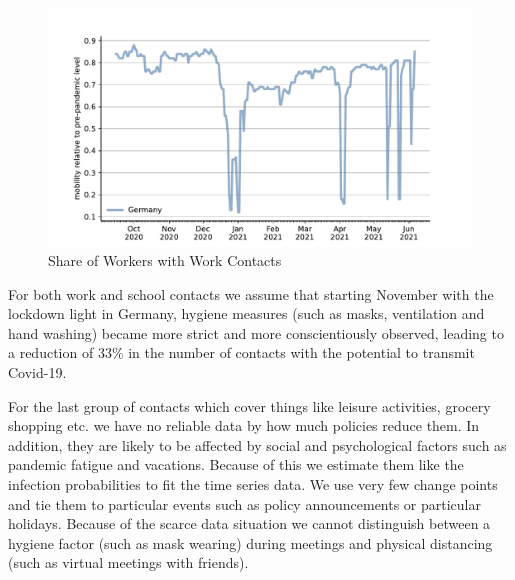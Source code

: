 \begin{figure}[ht]
    \centering
    \includegraphics[width=\textwidth]{figures/results/figures/data/work_multiplier_since_sep}
    \caption{Share of Workers with Work Contacts}
    \label{fig:work_multiplier}
\end{figure}

For both work and school contacts we assume that starting November with the lockdown
light in Germany, hygiene measures (such as masks, ventilation and hand washing) became
more strict and more conscientiously observed, leading to a reduction of 33\% in the
number of contacts with the potential to transmit Covid-19.

For the last group of contacts which cover things like leisure activities, grocery
shopping etc. we have no reliable data by how much policies reduce them. In addition,
they are likely to be affected by social and psychological factors such as pandemic
fatigue and vacations. Because of this we estimate them like the infection probabilities
to fit the time series data. We use very few change points and tie them to particular
events such as policy announcements or particular holidays. Because of the scarce data
situation we cannot distinguish between a hygiene factor (such as mask wearing) during
meetings and physical distancing (such as virtual meetings with
friends).


